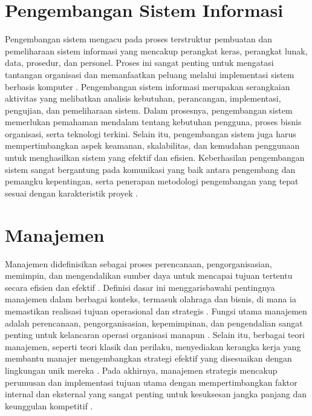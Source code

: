 
\section{Pengembangan Sistem Informasi}
Pengembangan sistem mengacu pada proses terstruktur pembuatan dan pemeliharaan sistem informasi yang mencakup perangkat keras, perangkat lunak, data, prosedur, dan personel. Proses ini sangat penting untuk mengatasi tantangan organisasi dan memanfaatkan peluang melalui implementasi sistem berbasis komputer \cite{efendi2023perkembangan}. Pengembangan sistem informasi merupakan serangkaian aktivitas yang melibatkan analisis kebutuhan, perancangan, implementasi, pengujian, dan pemeliharaan sistem. Dalam prosesnya, pengembangan sistem memerlukan pemahaman mendalam tentang kebutuhan pengguna, proses bisnis organisasi, serta teknologi terkini. Selain itu, pengembangan sistem juga harus mempertimbangkan aspek keamanan, skalabilitas, dan kemudahan penggunaan untuk menghasilkan sistem yang efektif dan efisien. Keberhasilan pengembangan sistem sangat bergantung pada komunikasi yang baik antara pengembang dan pemangku kepentingan, serta penerapan metodologi pengembangan yang tepat sesuai dengan karakteristik proyek \cite{efendi2023perkembangan}.

\section{Manajemen}
Manajemen didefinisikan sebagai proses perencanaan, pengorganisasian, memimpin, dan mengendalikan sumber daya untuk mencapai tujuan tertentu secara efisien dan efektif \cite{kaehler2019concept}. Definisi dasar ini menggarisbawahi pentingnya manajemen dalam berbagai konteks, termasuk olahraga dan bisnis, di mana ia memastikan realisasi tujuan operasional dan strategis \cite{kaehler2019concept}. Fungsi utama manajemen adalah perencanaan, pengorganisasian, kepemimpinan, dan pengendalian sangat penting untuk kelancaran operasi organisasi manapun \cite{feng2009internal}. Selain itu, berbagai teori manajemen, seperti teori klasik dan perilaku, menyediakan kerangka kerja yang membantu manajer mengembangkan strategi efektif yang disesuaikan dengan lingkungan unik mereka \cite{hussain2019management}. Pada akhirnya, manajemen strategis mencakup perumusan dan implementasi tujuan utama dengan mempertimbangkan faktor internal dan eksternal yang sangat penting untuk kesuksesan jangka panjang dan keunggulan kompetitif \cite{schuhly2022strategic}.


